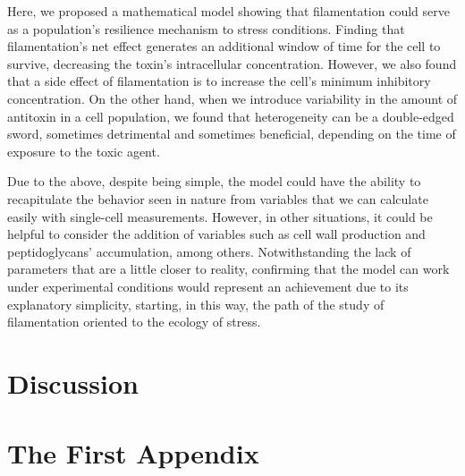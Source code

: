 \documentclass[a4paper, nobind]{templates/ociamthesis}
\newcommand*{\bibtitle}{Works Cited}
\begin{document}
Here, we proposed a mathematical model showing that filamentation could serve as a population's resilience mechanism to stress conditions.
Finding that filamentation's net effect generates an additional window of time for the cell to survive, decreasing the toxin's intracellular concentration.
However, we also found that a side effect of filamentation is to increase the cell's minimum inhibitory concentration.
On the other hand, when we introduce variability in the amount of antitoxin in a cell population, we found that heterogeneity can be a double-edged sword, sometimes detrimental and sometimes beneficial, depending on the time of exposure to the toxic agent.

Due to the above, despite being simple, the model could have the ability to recapitulate the behavior seen in nature from variables that we can calculate easily with single-cell measurements.
However, in other situations, it could be helpful to consider the addition of variables such as cell wall production and peptidoglycans' accumulation, among others.
Notwithstanding the lack of parameters that are a little closer to reality, confirming that the model can work under experimental conditions would represent an achievement due to its explanatory simplicity, starting, in this way, the path of the study of filamentation oriented to the ecology of stress.

\hypertarget{chapter-discussion}{%
\chapter{Discussion}\label{chapter-discussion}}

\minitoc 

\noindent

\startappendices

\hypertarget{the-first-appendix}{%
\chapter{The First Appendix}\label{the-first-appendix}}


\setlength{\baselineskip}{0pt} %

{\renewcommand*\MakeUppercase[1]{#1}%
\printbibliography[heading=bibintoc,title={\bibtitle}]}
\end{document}
